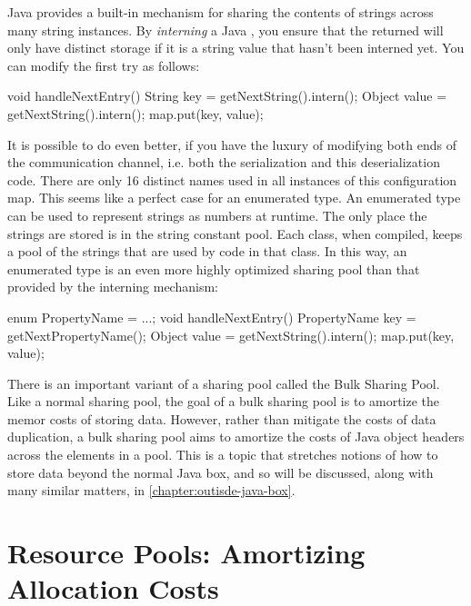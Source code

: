 Java provides a built-in mechanism for sharing the contents of strings across
many string instances. By \emph{interning} a Java
, you ensure that the returned  will only have
distinct storage if it is a string value that hasn't been interned yet. You can
modify the first try as follows:

\begin{shortlisting}
void handleNextEntry() {
	String key = getNextString().intern();
	Object value = getNextString().intern();
	map.put(key, value);
}
\end{shortlisting} 

It is possible to do even better, if you have the luxury of modifying both ends
of the communication channel, i.e. both the serialization and this
deserialization code. There are only 16 distinct names used in all instances of
this configuration map. This seems like a perfect case for an enumerated type.
An enumerated type can be used to represent strings as numbers at runtime. The
only place the strings are stored is in the string constant pool. Each class, when compiled, keeps a pool of the strings that
are used by code in that class. In this way, an enumerated type is an even more
highly optimized sharing pool than that provided by the interning mechanism:

\begin{shortlisting}
enum PropertyName = {...};
void handleNextEntry() {
	PropertyName key = getNextPropertyName();
	Object value = getNextString().intern();
	map.put(key, value);
}
\end{shortlisting} 

There is an important variant of a sharing pool called the Bulk Sharing Pool.
Like a normal sharing pool, the goal of a bulk sharing pool is to amortize the
memor costs of storing data. However, rather than mitigate the costs of data
duplication, a bulk sharing pool aims to amortize the costs of Java object
headers across the elements in a pool. This is a topic that stretches notions of
how to store data beyond the normal Java box, and so will be discussed, along
with many similar matters, in \autoref{chapter:outisde-java-box}.

\section{Resource Pools: Amortizing Allocation Costs}
\label{sec:resource-pools}

